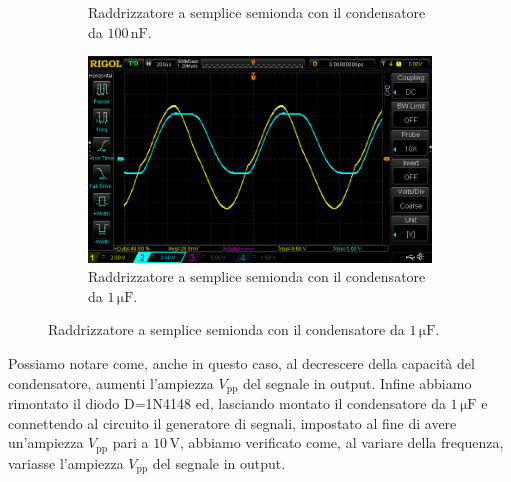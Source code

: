 \documentclass[a4paper]{article}
\begin{document}
\begin{figure}[h!]
\begin{subfigure}{0.4\textwidth}
						\caption{Raddrizzatore a semplice semionda con il condensatore da $ 100 \, \mathrm{nF} $.}
					\end{subfigure}
					\begin{subfigure}{1\textwidth}
						\centering
						\includegraphics[scale=0.3]{raddrizzatoreASempliceSemiondaDiodoDiZener1micro}
						\caption{Raddrizzatore a semplice semionda con il condensatore da $ 1 \, \mathrm{\mu F} $.}
					\end{subfigure}
					\label{fig:raddrizzatoreASempliceSemiondaDiodoDiZener}
				\end{figure}
				\newpage
				Possiamo notare come, anche in questo caso, al decrescere della capacità del condensatore, aumenti l'ampiezza $ V_{\mathrm{pp}} $ del segnale in output.
				\newline
				Infine abbiamo rimontato il diodo D=1N4148 ed, lasciando montato il condensatore da $ 1 \, \mathrm{\mu F} $ e connettendo al circuito il generatore di segnali, impostato al fine di avere un'ampiezza $ V_{\mathrm{pp}} $ pari a $ 10 \, \mathrm{V} $, abbiamo verificato come, al variare della frequenza, variasse l'ampiezza $ V_{\mathrm{pp}} $ del segnale in output.
\end{document}
